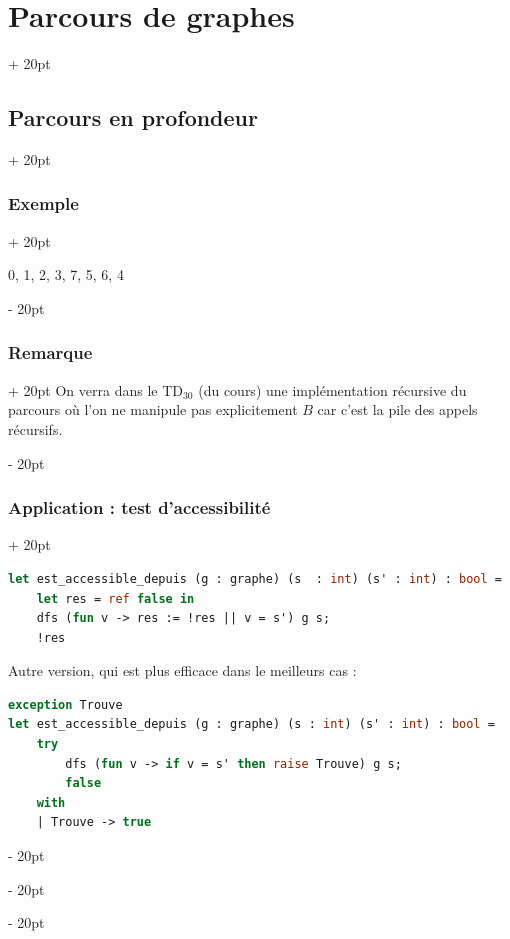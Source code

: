 \documentclass[a4paper, 12pt, twoside]{article}
\newcommand{\ind}[1][20pt]{\advance\leftskip + #1}
\newcommand{\deind}[1][20pt]{\advance\leftskip - #1}
\newenvironment{indt}[2][20pt]{#2 \par \ind[#1]}{\par \deind} %
\begin{document}
\begin{indt}{\section{Parcours de graphes}}
\begin{indt}{\subsection{Parcours en profondeur}}
\begin{indt}{\subsubsection{Exemple}}
\begin{center}
                \end{center}

                0, 1, 2, 3, 7, 5, 6, 4
            \end{indt}

            \vspace{12pt}
            
            \begin{indt}{\subsubsection{Remarque}}
                On verra dans le TD$_{30}$ (du cours) une implémentation récursive du parcours où l'on ne manipule pas explicitement $B$ car c'est la pile des appels récursifs.
            \end{indt}

            \vspace{12pt}
            
            \begin{indt}{\subsubsection{Application : test d'accessibilité}}
                \begin{lstlisting}[language=Caml, xleftmargin=80pt]
let est_accessible_depuis (g : graphe) (s  : int) (s' : int) : bool =
    let res = ref false in
    dfs (fun v -> res := !res || v = s') g s;
    !res\end{lstlisting}

                Autre version, qui est plus efficace dans le meilleurs cas :

                \begin{lstlisting}[language=Caml, xleftmargin=80pt]
exception Trouve
let est_accessible_depuis (g : graphe) (s : int) (s' : int) : bool =
    try
        dfs (fun v -> if v = s' then raise Trouve) g s;
        false
    with
    | Trouve -> true\end{lstlisting}
            \end{indt}


\end{indt}
\end{indt}
\end{document}
